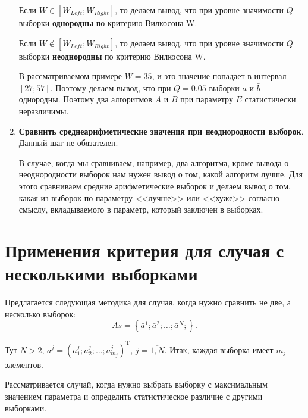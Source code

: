 \documentclass[a4paper,12pt]{article}
\begin{document}
\begin{enumerate}
Если $W \in \left[ W_{Left}; W_{Right}\right] $, то делаем вывод, что при уровне значимости $Q$ выборки \textbf{однородны} по критерию Вилкосона W.

Если $W \notin \left[ W_{Left}; W_{Right}\right] $, то делаем вывод, что при уровне значимости $Q$ выборки \textbf{неоднородны} по критерию Вилкосона W.

В рассматриваемом примере $W=35$, и это значение попадает в интервал  $\left[ 27; 57\right] $. Поэтому делаем вывод, что при $ Q=0.05 $ выборки $ \bar{a} $ и $ \bar{b} $ однородны. Поэтому два алгоритмов $A$ и $B$ при параметру $E$ статистически неразличимы.

\item \textbf{Сравнить среднеарифметические значения при неоднородности выборок}. Данный шаг не обязателен.

В случае, когда мы сравниваем, например, два алгоритма, кроме вывода о неоднородности выборок нам нужен вывод о том, какой алгоритм лучше. Для этого сравниваем средние арифметические выборок и делаем вывод о том, какая из выборок по параметру <<лучше>> или <<хуже>> согласно смыслу, вкладываемого в параметр, который заключен в выборках.

\end{enumerate}

\section{Применения критерия для случая с несколькими выборками}\label{WilcoxonW:section_samples}

Предлагается следующая методика для случая, когда нужно сравнить не две, а несколько выборок:
\begin{equation}
As = \left\lbrace \bar{a}^1; \bar{a}^2; \ldots; \bar{a}^N; \right\rbrace.
\end{equation}

Тут $ N>2 $, $ \bar{a}^j=\left(\bar{a}^j_1 ;\bar{a}^j_2;\ldots;\bar{a}^j_{m_j} \right)^\mathrm{T} $, $ j=\overline{1,N}$. Итак, каждая выборка имеет $ m_j $ элементов.

Рассматривается случай, когда нужно выбрать выборку с максимальным значением параметра и определить статистическое различие с другими выборками.
\end{document}
